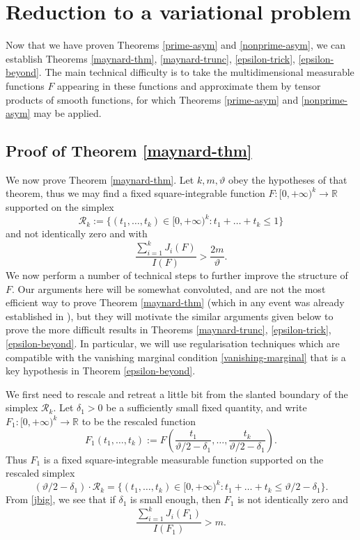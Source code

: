 \documentclass{bmcart}
\theoremstyle{plain}
\theoremstyle{definition}
\newcommand\R{\mathbb{R}}
\begin{document}
\section{Reduction to a variational problem}\label{variational-sec}

Now that we have proven Theorems \ref{prime-asym} and \ref{nonprime-asym}, we can establish Theorems \ref{maynard-thm}, \ref{maynard-trunc}, \ref{epsilon-trick}, \ref{epsilon-beyond}.  The main technical difficulty is to take the multidimensional measurable functions $F$ appearing in these functions and approximate them by tensor products of smooth functions, for which Theorems \ref{prime-asym} and \ref{nonprime-asym} may be applied.

\subsection{Proof of Theorem \ref{maynard-thm}}\label{may-sec}

We now prove Theorem \ref{maynard-thm}.  Let $k, m, \vartheta$ obey the hypotheses of that theorem, thus we may find a fixed square-integrable function $F: [0,+\infty)^k \to \R$ supported on the simplex
$$ {\mathcal R}_k := \{ (t_1,\dots,t_k) \in [0,+\infty)^k: t_1+\dots+t_k \leq 1 \}$$
and not identically zero and with
\begin{equation}\label{jbig}
 \frac{\sum_{i=1}^k J_i(F)}{I(F)} > \frac{2m}{\vartheta}.
\end{equation}
We now perform a number of technical steps to further improve the structure of $F$.  Our arguments here will be somewhat convoluted, and are not the most efficient way to prove Theorem \ref{maynard-thm} (which in any event was already established in \cite{maynard-new}), but they will motivate the similar arguments given below to prove the more difficult results in Theorems \ref{maynard-trunc}, \ref{epsilon-trick}, \ref{epsilon-beyond}.  In particular, we will use regularisation techniques which are compatible with the vanishing marginal condition \eqref{vanishing-marginal} that is a key hypothesis in Theorem \ref{epsilon-beyond}.

We first need to rescale and retreat a little bit from the slanted boundary of the simplex ${\mathcal R}_k$.
Let $\delta_1 > 0$ be a sufficiently small fixed quantity, and write $F_1: [0,+\infty)^k \to \R$ to be the rescaled function
$$ F_1(t_1,\dots,t_k) := F( \frac{t_1}{\vartheta/2-\delta_1}, \dots, \frac{t_k}{\vartheta/2-\delta_1} ).$$
Thus $F_1$ is a fixed square-integrable measurable function supported on the rescaled simplex
$$ (\vartheta/2-\delta_1) \cdot {\mathcal R}_k = \{ (t_1,\dots,t_k) \in [0,+\infty)^k: t_1+\dots+t_k \leq \vartheta/2-\delta_1 \}.$$
From \eqref{jbig}, we see that if $\delta_1$ is small enough, then $F_1$ is not identically zero and
\begin{equation}\label{jbig-2}
 \frac{\sum_{i=1}^k J_i(F_1)}{I(F_1)} > m.
\end{equation}
\end{document}
